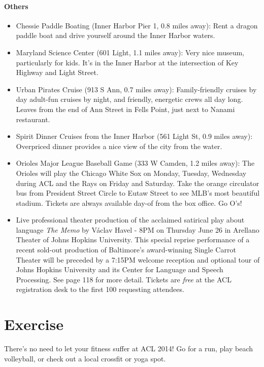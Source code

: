 \paragraph*{Others}
\begin{itemize}
\item{Chessie Paddle Boating (Inner Harbor Pier 1, 0.8 miles away): Rent a dragon paddle boat and drive yourself around the Inner Harbor waters.}
\item{Maryland Science Center (601 Light, 1.1 miles away): Very nice museum, particularly for kids. It's in the Inner Harbor at the intersection of Key Highway and Light Street.}
\item{Urban Pirates Cruise (913 S Ann, 0.7 miles away): Family-friendly cruises by day adult-fun cruises by night, and friendly, energetic crews all day long. Leaves from the end of Ann Street in Fells Point, just next to Nanami restaurant.}
\item{Spirit Dinner Cruises from the Inner Harbor (561 Light St, 0.9 miles away): Overpriced dinner provides a nice view of the city from the water.}
\item{Orioles Major League Baseball Game (333 W Camden, 1.2 miles away): The Orioles will play the Chicago White Sox on Monday, Tuesday, Wednesday during ACL and the Rays on Friday and Saturday. Take the orange circulator bus from President Street Circle to Eutaw Street to see MLB's most beautiful stadium. Tickets are always available day-of from the box office. Go O's!}
\item{Live professional theater production of the acclaimed satirical play about language {\it The Memo} by V\'{a}clav Havel - 8PM on Thursday June 26 in Arellano Theater of Johns Hopkins University. This special reprise performance of a recent sold-out production of Baltimore’s award-winning Single Carrot Theater will be preceded by a 7:15PM welcome reception and optional tour of Johns Hopkins University and its Center for Language and Speech Processing. See page 118 for more detail. Tickets are {\it free} at the ACL registration desk to the first 100 requesting attendees.}
\end{itemize}

\section{Exercise}
There's no need to let your fitness suffer at ACL 2014! Go for a run, play beach volleyball, or check out a local crossfit or yoga spot. 

